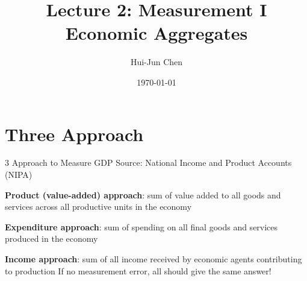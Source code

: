 \documentclass[11pt,aspectratio=169,usenames,dvipsnames]{beamer}
\title[Lecture 1]{Lecture 2: Measurement I \\ Economic Aggregates}
\author[Hui-Jun Chen]{Hui-Jun Chen}
\institute{National Tsing Hua University}
\date{\today}
\let\tempa\enumerate
\let\tempb\endenumerate
\renewenvironment{enumerate}{\tempa\addtolength{\itemsep}{\fill}}{\tempb}
\begin{document}
\begin{frame}[plain]
    \titlepage
\end{frame}



\section{Three Approach}
\label{sec:Three_Approach}

\begin{frame}{$3$ Approach to Measure GDP}
\label{slide:_3__Approach_to_Measure_GDP}
Source: National Income and Product Accounts (NIPA)
\begin{enumerate}
    \item \textbf{Product (value-added) approach}: sum of \alert{value added} to all goods and services across all productive units in the economy
    \item \textbf{Expenditure approach}: sum of \alert{spending} on all final goods and services produced in the economy
    \item \textbf{Income approach}: sum of all \alert{income received} by economic agents contributing to production
\end{enumerate}
If no measurement error, all should give the same answer!
\end{frame}
\end{document}
